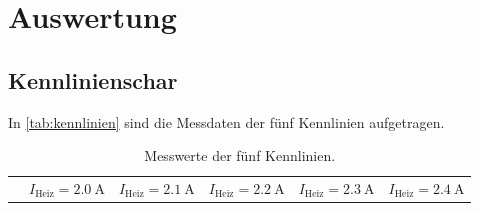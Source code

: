 \section{Auswertung}
\label{sec:Auswertung}

\subsection{Kennlinienschar}

In \autoref{tab:kennlinien} sind die Messdaten der fünf Kennlinien aufgetragen.
\begin{table}
  \centering
  \caption{Messwerte der fünf Kennlinien.}
  \label{tab:kennlinien}
  \begin{tabular}{c c c c c c}
    \toprule
    & \multicolumn{1}{c}{$I_{\text{Heiz}} = \qty{2.0}{\ampere}$} &
      \multicolumn{1}{c}{$I_{\text{Heiz}} = \qty{2.1}{\ampere}$} &
      \multicolumn{1}{c}{$I_{\text{Heiz}} = \qty{2.2}{\ampere}$} &
      \multicolumn{1}{c}{$I_{\text{Heiz}} = \qty{2.3}{\ampere}$} &
      \multicolumn{1}{c}{$I_{\text{Heiz}} = \qty{2.4}{\ampere}$} \\
      \cmidrule(lr){2-2}\cmidrule(lr){3-3}\cmidrule(lr){4-4}\cmidrule(lr){5-5}\cmidrule(lr){6-6}


\end{tabular}
\end{table}
